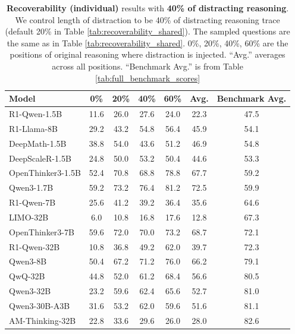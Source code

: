 \documentclass{article} %
\begin{document}
\begin{table}[ht!]
  \centering
  \begin{tabular}{lccccc|c}
    \toprule
    \textbf{Model} & \textbf{0\%} & \textbf{20\%} & \textbf{40\%} & \textbf{60\%} & \textbf{Avg.} & \textbf{Benchmark Avg.} \\
    \midrule
    R1-Qwen-1.5B    & 11.6 & 26.0 & 27.6 & 24.0 & 22.3 & 47.5 \\
    R1-Llama-8B             & 29.2 & 43.2 & 54.8 & 56.4 & 45.9 & 54.1 \\
    DeepMath-1.5B           & 38.8 & 54.0 & 43.6 & 51.2 & 46.9 & 54.8 \\
    DeepScaleR-1.5B         & 24.8 & 50.0 & 53.2 & 50.4 & 44.6 & 53.3 \\
    OpenThinker3-1.5B       & 52.4 & 70.8 & 68.8 & 78.8 & 67.7 & 59.2 \\
    Qwen3-1.7B              & 59.2 & 73.2 & 76.4 & 81.2 & 72.5 & 59.9 \\
    \midrule
    R1-Qwen-7B      & 25.6 & 41.2 & 39.2 & 36.4 & 35.6 & 64.6 \\
    LIMO-32B                & 6.0 & 10.8 & 16.8 & 17.6 & 12.8 & 67.3 \\
    OpenThinker3-7B         & 59.6 & 72.0 & 70.0 & 73.2 & 68.7 & 72.1 \\
    R1-Qwen-32B     & 10.8 & 36.8 & 49.2 & 62.0 & 39.7 & 72.3 \\
    \midrule
    Qwen3-8B                & 50.4 & 67.2 & 71.2 & 76.0 & 66.2 & 79.1 \\
    QwQ-32B                 & 44.8 & 52.0 & 61.2 & 68.4 & 56.6 & 80.5 \\
    Qwen3-32B               & 23.2 & 59.6 & 62.4 & 65.6 & 52.7 & 81.0 \\
    Qwen3-30B-A3B           & 31.6 & 53.2 & 62.0 & 59.6 & 51.6 & 81.1 \\
    AM-Thinking-32B      & 22.8 & 33.6 & 29.6 & 26.0 & 28.0 & 82.6 \\
    \bottomrule
  \end{tabular}
  \caption{\textbf{Recoverability (individual)} results with \textbf{40\% of distracting reasoning}. We control length of distraction to be 40\% of distracting reasoning trace (default 20\% in Table \ref{tab:recoverability_shared}). The sampled questions are the same as in Table \ref{tab:recoverability_shared}. 0\%, 20\%, 40\%, 60\% are the positions of original reasoning where distraction is injected. ``Avg.'' averages across all positions. ``Benchmark Avg.'' is from Table \ref{tab:full_benchmark_scores}}
  \label{tab:recoverability_individial_40percent}
\end{table}
\end{document}
